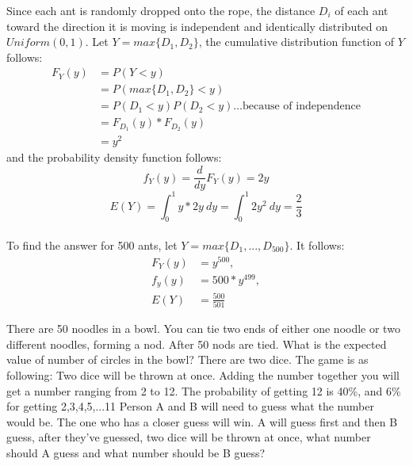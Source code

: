 \documentclass[answers]{exam}
\begin{document}
\begin{questions}
\begin{solution}
Since each ant is randomly dropped onto the rope, the distance $D_i$ of each ant toward the direction it is moving is 
independent and identically distributed on $Uniform(0,1)$. 
Let $Y = max\{D_1, D_2\}$, the cumulative distribution function of $Y$ follows:
\begin{align*}
    F_Y(y) &= P(Y<y)\\
    &= P(max\{D_1, D_2\}<y)\\
    &= P(D_1<y)P(D_2<y) \dots \text{because of independence}\\
    &= F_{D_1}(y)*F_{D_2}(y)\\
    &= y^2
\end{align*}
and the probability density function follows:
$$f_Y(y) = \frac{d}{dy}F_Y(y) = 2y$$
$$E(Y) = \int_{0}^{1} y * 2y\ dy = \int_{0}^{1}2y^2\ dy = \frac{2}{3}$$
\\
To find the answer for 500 ants, let $Y = max\{D_1,..., D_{500}\}$. It follows:
\begin{align*}
    F_Y(y) &= y^{500},\\
    f_y(y) &= 500*y^{499},\\
    E(Y) &= \frac{500}{501}
\end{align*}

\end{solution}

\question
There are 50 noodles in a bowl. 
You can tie two ends of either one noodle or two different noodles, forming a nod.
After 50 nods are tied. What is the expected value of number of circles in the bowl?
\question
There are two dice. The game is as following: 
Two dice will be thrown at once. 
Adding the number together you will get a number ranging from 2 to 12.
The probability of getting 12 is 40\%, and 6\% for getting 2,3,4,5,...11
Person A and B will need to guess what the number would be. 
The one who has a closer guess will win.
A will guess first and then B guess, after they've guessed, 
two dice will be thrown at once, 
what number should A guess and what number should be B guess?
\end{questions}
\end{document}
